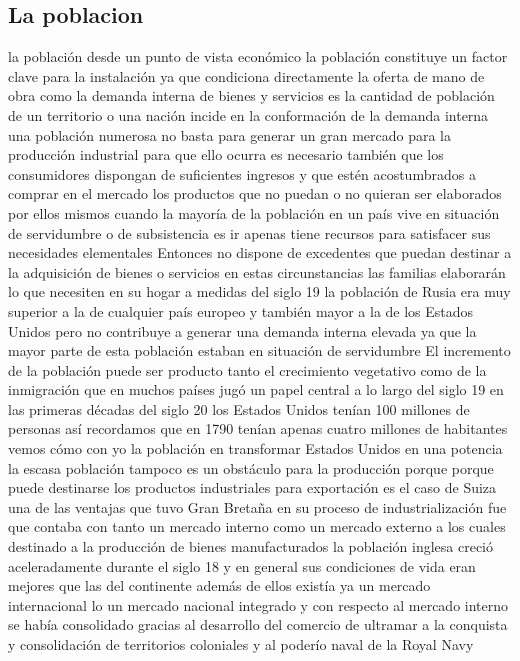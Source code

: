 \documentclass[12pt]{book}++
\begin{document}
\subsection{La poblacion}
la población desde un punto de vista económico la población constituye un factor clave para la instalación ya que condiciona directamente la oferta de mano de obra como la demanda interna de bienes y servicios es la cantidad de población de un territorio o una nación incide en la conformación de la demanda interna una población numerosa no basta para generar un gran mercado para la producción industrial para que ello ocurra es necesario también que los consumidores dispongan de suficientes ingresos y que estén acostumbrados a comprar en el mercado los productos que no puedan o no quieran ser elaborados por ellos mismos cuando la mayoría de la población en un país vive en situación de servidumbre o de subsistencia es ir apenas tiene recursos para satisfacer sus necesidades elementales Entonces no dispone de excedentes que puedan destinar a la adquisición de bienes o servicios en estas circunstancias las familias elaborarán lo que necesiten en su hogar a medidas del siglo 19 la población de Rusia era muy superior a la de cualquier país europeo y también mayor a la de los Estados Unidos pero no contribuye a generar una demanda interna elevada ya que la mayor parte de esta población estaban en situación de servidumbre El incremento de la población puede ser producto tanto el crecimiento vegetativo como de la inmigración que en muchos países jugó un papel central a lo largo del siglo 19 en las primeras décadas del siglo 20 los Estados Unidos tenían 100 millones de personas así recordamos que en 1790 tenían apenas cuatro millones de habitantes vemos cómo con yo la población en transformar Estados Unidos en una potencia la escasa población tampoco es un obstáculo para la producción porque porque puede destinarse los productos industriales para exportación es el caso de Suiza una de las ventajas que tuvo Gran Bretaña en su proceso de industrialización fue que contaba con tanto un mercado interno como un mercado externo a los cuales destinado a la producción de bienes manufacturados la población inglesa creció aceleradamente durante el siglo 18 y en general sus condiciones de vida eran mejores que las del continente además de ellos existía ya un mercado internacional lo un mercado nacional integrado y con respecto al mercado interno se había consolidado gracias al desarrollo del comercio de ultramar a la conquista y consolidación de territorios coloniales y al poderío naval de la Royal Navy
\end{document}
